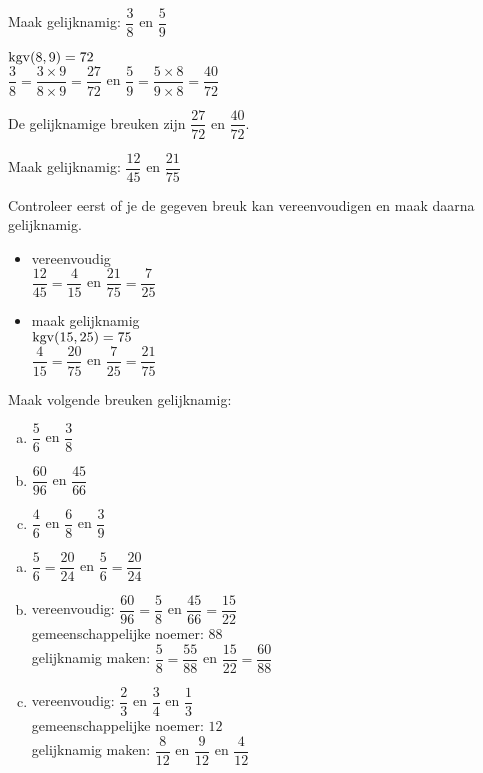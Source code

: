\documentclass[12pt]{article}
\begin{document}
\begin{voorbeeld}
Maak gelijknamig: $\dfrac{3}{8}$ en $\dfrac{5}{9}$

$\kgv(8,9)=72$\\

$\dfrac{3}{8}= \dfrac{3\times 9}{8\times 9}=\dfrac{27}{72}$ en
$\dfrac{5}{9}= \dfrac{5\times 8}{9\times 8}=\dfrac{40}{72}$

De gelijknamige breuken zijn $\dfrac{27}{72}$ en $\dfrac{40}{72}$.
\end{voorbeeld}

\begin{voorbeeld}
Maak gelijknamig: $\dfrac{12}{45}$ en $\dfrac{21}{75}$

Controleer eerst of je de gegeven breuk kan vereenvoudigen en maak daarna gelijknamig.

\begin{itemize}
  \item vereenvoudig\\
  $\dfrac{12}{45}=\dfrac{4}{15}$ en $\dfrac{21}{75}=\dfrac{7}{25}$
  \item maak gelijknamig\\
  $\kgv(15,25)=75$\\
  $\dfrac{4}{15}= \dfrac{20}{75}$ en
  $\dfrac{7}{25}= \dfrac{21}{75}$
\end{itemize}
\end{voorbeeld}

\begin{exercise}
Maak volgende breuken gelijknamig:
\begin{enumerate}[(a)]
  \item $\dfrac{5}{6}$ en $\dfrac{3}{8}$
  \item $\dfrac{60}{96}$ en $\dfrac{45}{66}$
  \item $\dfrac{4}{6}$ en $\dfrac{6}{8}$ en $\dfrac{3}{9}$
\end{enumerate}
\end{exercise}

\begin{solution}
\begin{enumerate}[(a)]
  \item $\dfrac{5}{6}=\dfrac{20}{24}$ en $\dfrac{5}{6}=\dfrac{20}{24}$
  \item vereenvoudig: $\dfrac{60}{96}=\dfrac{5}{8}$ en $\dfrac{45}{66}=\dfrac{15}{22}$\\
  gemeenschappelijke noemer: $88$\\
  gelijknamig maken: $\dfrac{5}{8}=\dfrac{55}{88}$ en $\dfrac{15}{22}=\dfrac{60}{88}$
  \item vereenvoudig: $\dfrac{2}{3}$ en $\dfrac{3}{4}$ en $\dfrac{1}{3}$\\
  gemeenschappelijke noemer: $12$\\
  gelijknamig maken: $\dfrac{8}{12}$ en $\dfrac{9}{12}$ en $\dfrac{4}{12}$\\
\end{enumerate}
\end{solution}
\end{document}
